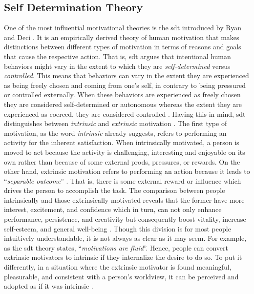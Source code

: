 \subsection{Self Determination Theory}
One of the most influential motivational theories is the \acrlong{sdt} introduced by Ryan and Deci \cite{deci1994promoting, ryan2000intrinsic, ryan2000self, deci2000and}. It is an empirically derived theory of human motivation that makes distinctions between different types of motivation in terms of reasons and goals that cause the respective action. That is, \acrshort{sdt} argues that intentional human behaviors might vary in the extent to which they are \textit{self-determined} versus \textit{controlled}. This means that behaviors can vary in the extent they are experienced as being freely chosen and coming from one's self, in contrary to being pressured or controlled externally. When these behaviors are experienced as freely chosen they are considered self-determined or autonomous whereas the extent they are experienced as coerced, they are considered controlled \cite{deci1994promoting}. Having this in mind, \acrshort{sdt} distinguishes between \textit{intrinsic} and \textit{extrinsic} motivation \cite{ryan2000intrinsic}. The first type of motivation, as the word \textit{intrinsic} already suggests, refers to performing an activity for the inherent satisfaction. When intrinsically motivated, a person is moved to act because the activity is challenging, interesting and enjoyable on its own rather than because of some external prods, pressures, or rewards. On the other hand, extrinsic motivation refers to performing an action because it leads to ``\textit{separable outcome}'' \cite{ryan2000self}. That is, there is some external reward or influence which drives the person to accomplish the task. The comparison between people intrinsically and those extrinsically motivated reveals that the former have more interest, excitement, and confidence which in turn, can not only enhance performance, persistence, and creativity but consequently boost vitality, increase self-esteem, and general well-being \cite{ryan2000self}. Though this division is for most people intuitively understandable, it is not always as clear as it may seem. For example, as the \acrshort{sdt} theory states, ``\textit{motivations are fluid}''. Hence, people can convert extrinsic motivators to intrinsic if they internalize the desire to do so. To put it differently, in a situation where the extrinsic motivator is found meaningful, pleasurable, and consistent with a person's worldview, it can be perceived and adopted as if it was intrinsic \cite{zichermann2012}.
